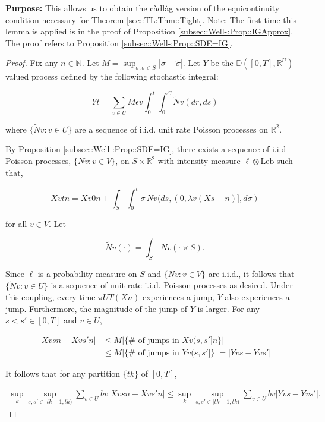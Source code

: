 \documentclass[12pt]{article}
\newcommand{\mb}{\mathbb}
\newcommand{\te}{\text}
\newcommand{\ep}{\epsilon}
\newcommand{\purpose}{\textbf{Purpose: }}
\newcommand{\ind}{\hspace{24pt}}
\newcommand{\cad}{\mb{D}}							%
\renewcommand{\v}{v}							%
\renewcommand{\U}{U}							%
\renewcommand{\S}{S}							%
\newcommand{\s}{\sigma}							%
\renewcommand{\b}{b}							%
\newcommand{\ev}{\ep}							%
\newcommand{\T}{T}								%
\renewcommand{\t}{t}							%
\newcommand{\proj}{\pi}							%
\renewcommand{\tt}{s}							%
\newcommand{\ttt}{s'}							%
\newcommand{\X}{X}								%
\newcommand{\const}{C}							%
\renewcommand{\ss}{\tilde{\s}}					%
\newcommand{\poiss}{N}							%
\newcommand{\leb}{\te{Leb}}						%
\newcommand{\Sm}{\ell}							%
\newcommand{\rate}{\lambda}						%
\renewcommand{\r}{r}							%
\newcommand{\cconst}{M}							%
\newcommand{\alt}[1]{\widetilde{#1}}			%
\newcommand{\XX}{Y}								%
\renewcommand{\it}{k}							%
\begin{document}
\purpose This allows us to obtain the c\`adl\`ag version of the equicontinuity condition necessary for Theorem \ref{sec::TL:Thm::Tight}. Note: The first time this lemma is applied is in the proof of Proposition \ref{subsec::Well-:Prop::IGApprox}. The proof refers to Proposition \ref{subsec::Well-:Prop::SDE=IG}.

\begin{proof}
Fix any \(n \in \mb{N}\). Let \(\cconst = \sup_{\s,\ss \in \S} |\s - \ss|\). Let \(\XX{}{}\) be the \(\cad([0,\T],\mb{R}^\U)\)-valued process defined by the following stochastic integral:

\[\XX{}{\t} = \sum_{\v \in \U}\cconst\ev{\v}\int_0^\t\int_0^{\const{}}\alt{\poiss}{\v}(d\r, d\tt)\]

where \(\{\alt{\poiss}{\v}:\v \in \U\}\) are a sequence of i.i.d. unit rate Poisson processes on \(\mb{R}^2\). 

\ind By Proposition \ref{subsec::Well-:Prop::SDE=IG}, there exists a sequence of i.i.d Poisson processes, \(\{\poiss{\v}:\v\in V\}\), on \(\S\times\mb{R}^2\) with intensity measure \(\Sm\otimes \leb\) such that,

\[\X{\v}{\t}{n} = \X{\v}{0}{n} + \int_\S\int_0^\t \s\,\poiss{\v}(d\tt,(0,\rate{\v}(\X{}{\tt-}{n})],d\s)\]

for all \(\v\in V\). Let

\[\alt{\poiss}{\v}(\cdot) = \int_\S\,\poiss{\v}(\cdot\times \S).\]

Since \(\Sm\) is a probability measure on \(\S\) and \(\{\poiss{\v}:\v\in V\}\) are i.i.d., it follows that \(\{\alt{\poiss}{\v}:\v\in \U\}\) is a sequence of unit rate i.i.d. Poisson processes as desired. Under this coupling, every time \(\proj{\U}{\T}(\X{}{}{n})\) experiences a jump, \(\XX{}{}\) also experiences a jump. Furthermore, the magnitude of the jump of \(\XX{}{}\) is larger. For any \(\tt<\ttt\in [0,\T]\) and \(\v\in \U\),

\begin{align*}
|\X{\v}{\tt}{n} - \X{\v}{\ttt}{n}|&\leq \cconst\left|\{\#\te{ of jumps in }\X{\v}{(\tt,\ttt]}{n}\}\right| \\
&\leq \cconst\left|\{\#\te{ of jumps in }\XX{\v}{(\tt,\ttt]}\}\right| = \left|\XX{\v}{\tt} - \XX{\v}{\ttt}\right|
\end{align*}

It follows that for any partition \(\{\t{\it}\}\) of \([0,\T]\),

\begin{align*}
\sup_\it\sup_{\tt,\ttt \in [\t{\it-1},\t{\it})} \sum_{\v\in \U} \b{\v}|\X{\v}{\tt}{n} - \X{\v}{\ttt}{n}|\leq \sup_\it\sup_{\tt,\ttt \in [\t{\it-1},\t{\it})} \sum_{\v\in \U} \b{\v}|\XX{\v}{\tt} - \XX{\v}{\ttt}|.
\end{align*}


\end{proof}
\end{document}
